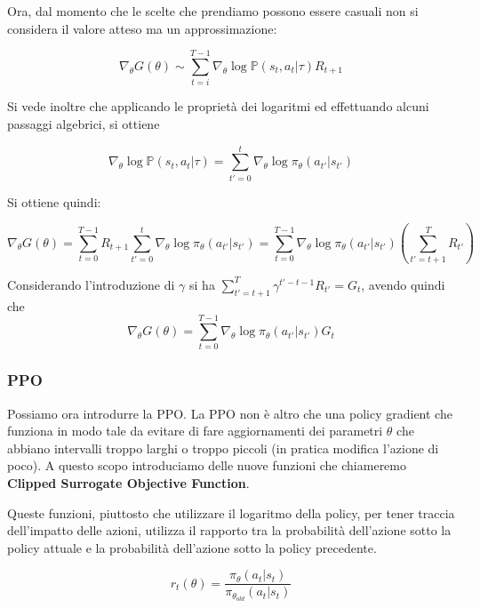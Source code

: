 \documentclass[a4paper,11pt,twoside]{report} %
\begin{document}
Ora, dal momento che le scelte che prendiamo possono essere casuali non si considera il valore atteso ma un approssimazione:

\begin{equation}
	\nabla_{\theta}G(\theta) \sim  \sum_{t=i}^{T-1}\nabla_{\theta}\log \mathbb{P}(s_{t},a_{t}|\tau)R_{t+1}
\end{equation}

Si vede inoltre che applicando le proprietà dei logaritmi ed effettuando alcuni passaggi algebrici, si ottiene

\begin{equation}
\nabla_{\theta}\log \mathbb{P}(s_{t},a_{t}|\tau) = \sum_{t' = 0}^{t}\nabla_{\theta}\log\pi_{\theta}(a_{t'}|s_{t'})
\end{equation}

Si ottiene quindi:

\begin{equation}
\nabla_{\theta}G(\theta) =  \sum_{t=0}^{T-1}R_{t+1}\sum_{t' = 0}^{t}\nabla_{\theta}\log \pi_{\theta}(a_{t'}|s_{t'}) = \sum_{t=0}^{T-1}\nabla_{\theta}\log \pi_{\theta}(a_{t'}|s_{t'})(\sum_{t'=t+1}^{T}R_{t'})
\end{equation}

Considerando l'introduzione di $\gamma$ si ha $\sum_{t'=t+1}^{T}\gamma^{t'-t-1}R_{t'} = G_{t}$, avendo quindi che
\begin{equation}
\nabla_{\theta}G(\theta) = \sum_{t=0}^{T-1}\nabla_{\theta}\log \pi_{\theta}(a_{t'}|s_{t'})G_{t}
\end{equation} 




\subsubsection{PPO}

Possiamo ora introdurre la PPO. La PPO non è altro che una policy gradient che funziona in modo tale da evitare di fare aggiornamenti dei parametri $\theta$ che abbiano intervalli troppo larghi o troppo piccoli (in pratica modifica l'azione di poco). A questo scopo introduciamo delle nuove funzioni che chiameremo \textbf{Clipped Surrogate Objective Function}.

Queste funzioni, piuttosto che utilizzare il logaritmo della policy, per tener traccia dell'impatto delle azioni, utilizza il rapporto tra la probabilità dell'azione sotto la policy attuale e la probabilità dell'azione sotto la policy precedente.

\begin{equation}
r_{t}(\theta) = \frac{\pi_{\theta}(a_{t}|s_{t})}{\pi_{\theta_{old}}(a_{t}|s_{t})}
\end{equation}
\end{document}
